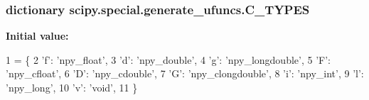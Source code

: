\subsubsection[{C\+\_\+\+T\+Y\+P\+E\+S}]{\setlength{\rightskip}{0pt plus 5cm}dictionary scipy.\+special.\+generate\+\_\+ufuncs.\+C\+\_\+\+T\+Y\+P\+E\+S}\label{namespacescipy_1_1special_1_1generate__ufuncs_a42df7cb237810d12d13f5dbb9f907dd9}
{\bfseries Initial value\+:}
\begin{DoxyCode}
1 = \{
2     \textcolor{stringliteral}{'f'}: \textcolor{stringliteral}{'npy\_float'},
3     \textcolor{stringliteral}{'d'}: \textcolor{stringliteral}{'npy\_double'},
4     \textcolor{stringliteral}{'g'}: \textcolor{stringliteral}{'npy\_longdouble'},
5     \textcolor{stringliteral}{'F'}: \textcolor{stringliteral}{'npy\_cfloat'},
6     \textcolor{stringliteral}{'D'}: \textcolor{stringliteral}{'npy\_cdouble'},
7     \textcolor{stringliteral}{'G'}: \textcolor{stringliteral}{'npy\_clongdouble'},
8     \textcolor{stringliteral}{'i'}: \textcolor{stringliteral}{'npy\_int'},
9     \textcolor{stringliteral}{'l'}: \textcolor{stringliteral}{'npy\_long'},
10     \textcolor{stringliteral}{'v'}: \textcolor{stringliteral}{'void'},
11 \}
\end{DoxyCode}
\hypertarget{namespacescipy_1_1special_1_1generate__ufuncs_a01863edc87085deb106b5ccc3e5ef3ef}{}
